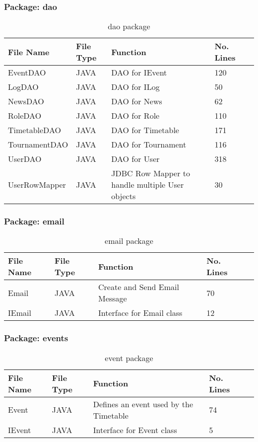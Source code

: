 \subsubsection{Package: dao}
\begin{table}[H]
\begin{center}
    \begin{tabular}{| l | l | l| l |p{1cm} |}
    \hline
    File Name & File Type & Function & No. Lines\\ \hline
    EventDAO & JAVA & DAO for IEvent & 120 \\ \hline
	LogDAO & JAVA & DAO for ILog & 50\\ \hline
	NewsDAO & JAVA & DAO for News & 62\\ \hline
	RoleDAO & JAVA & DAO for Role & 110 \\ \hline
	TimetableDAO & JAVA & DAO for Timetable & 171\\ \hline
	TournamentDAO & JAVA & DAO for Tournament & 116\\ \hline
	UserDAO & JAVA & DAO for User & 318 \\ \hline
	UserRowMapper & JAVA & JDBC Row Mapper to handle multiple User objects & 30\\ \hline	
    \end{tabular}
\end{center}
\caption{dao package}
\end{table}

\subsubsection{Package: email}
\begin{table}[H]
\begin{center}
     \begin{tabular}{| l | l | l| l |p{1cm} |}
    \hline
    File Name & File Type & Function & No. Lines\\ \hline
    Email & JAVA & Create and Send Email Message & 70\\ \hline
	IEmail & JAVA & Interface for Email class & 12\\ \hline	
    \end{tabular}
\end{center}
\caption{email package}
\end{table}

\subsubsection{Package: events}
\begin{table}[H]
\begin{center}
      \begin{tabular}{| l | l | l| l |p{1cm} |}
    \hline
    File Name & File Type & Function & No. Lines\\ \hline
    Event & JAVA & Defines an event used by the Timetable & 74\\ \hline
	IEvent & JAVA & Interface for Event class & 5\\ \hline	
    \end{tabular}
\end{center}
\caption{event package}
\end{table}

